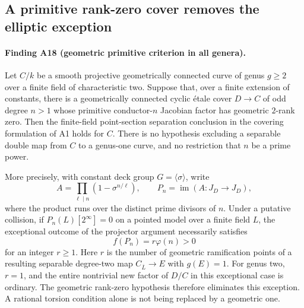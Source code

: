 \subsection{A primitive rank-zero cover removes the elliptic exception}
\label{sec:geometric-primitive-all-genera}

\paragraph{Finding A18 (geometric primitive criterion in all genera).}
Let $C/k$ be a smooth projective geometrically connected curve of
genus $g\ge2$ over a finite field of characteristic two.
Suppose that, over a finite extension of constants, there is a
geometrically connected cyclic \'etale cover $D\to C$ of odd degree
$n>1$ whose primitive conductor-$n$ Jacobian factor has geometric
$2$-rank zero.  Then the finite-field point-section separation
conclusion in the covering formulation of A1 holds for $C$.
There is no hypothesis excluding a separable double map from $C$
to a genus-one curve, and no restriction that $n$ be a prime power.

More precisely, with constant deck group $G=\langle\sigma\rangle$,
write
\[
 A=\prod_{\ell\mid n}(1-\sigma^{n/\ell}),\qquad
 P_n=\operatorname{im}(A:J_D\longrightarrow J_D),
 \tag{GP.1}
\]
where the product runs over the distinct prime divisors of $n$.
Under a putative collision, if $P_n(L)[2^\infty]=0$ on a pointed
model over a finite field $L$, the exceptional outcome of the
projector argument necessarily satisfies
\[
                         f(P_n)=r\varphi(n)>0
 \tag{GP.2}
\]
for an integer $r\ge1$.  Here $r$ is the number of geometric
ramification points of a resulting separable degree-two map
$C_{\overline L}\to E$ with $g(E)=1$.
For genus two, $r=1$, and the entire nontrivial new factor of
$D/C$ in this exceptional case is ordinary.
The geometric rank-zero hypothesis therefore eliminates this
exception.  A rational torsion condition alone is not being
replaced by a geometric one.

